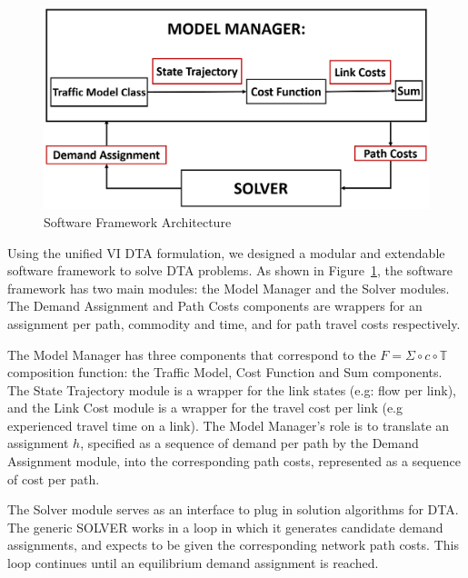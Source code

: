 \documentclass[conference]{IEEEtran}
\renewcommand{\:}{\mathrel{\coloneqq}}
\renewcommand{\=}{\ensuremath{\eqqcolon}}
\newcommand{\0}{\ensuremath{\boldsymbol{0}}}
\begin{document}
\begin{figure}[h]
    \centering
    \includegraphics[width=\linewidth]{Software_Block_Diagram.PNG}
    \caption{Software Framework Architecture}
    \label{fig:Block_Diagram}
\end{figure}

Using the unified VI DTA formulation, we designed a modular and extendable software framework to solve DTA problems. As shown in Figure~\ref{fig:Block_Diagram}, the software framework has two main modules: the Model Manager and the Solver modules. The Demand Assignment and Path Costs components are wrappers for an assignment per path, commodity and time, and for path travel costs respectively.

The Model Manager has three components that correspond to the $F = \Sigma\circ c \circ \mathbb{T}$ composition function: the Traffic Model, Cost Function and Sum components. The State Trajectory module is a wrapper for the link states (e.g: flow per link), and the Link Cost module is a wrapper for the travel cost per link (e.g experienced travel time on a link). The Model Manager's role is to translate an assignment $h$, specified as a sequence of demand per path by the Demand Assignment module, into the corresponding path costs, represented as a sequence of cost per path.

The Solver module serves as an interface to plug in solution algorithms for DTA. The generic SOLVER works in a loop in which it generates candidate demand assignments, and expects to be given the corresponding network path costs. This loop continues until an equilibrium demand assignment is reached. 
\end{document}
